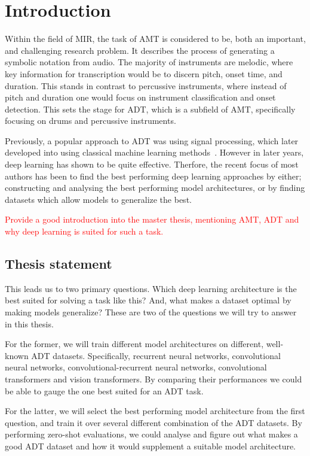 \chapter{Introduction}

Within the field of \gls{MIR}, the task of \gls{AMT} is considered to be, both an important, and challenging research problem. It describes the process of generating a symbolic notation from audio. The majority of instruments are melodic, where key information for transcription would be to discern pitch, onset time, and duration. This stands in contrast to percussive instruments, where instead of pitch and duration one would focus on instrument classification and onset detection. This sets the stage for \gls{ADT}, which is a subfield of \gls{AMT}, specifically focusing on drums and percussive instruments.~\cite{8350302}

Previously, a popular approach to \gls{ADT} was using signal processing, which later developed into using classical machine learning methods~\cite{8350302}. However in later years, deep learning has shown to be quite effective. Therfore, the recent focus of most authors has been to find the best performing deep learning approaches by either; constructing and analysing the best performing model architectures, or by finding datasets which allow models to generalize the best.~\cite{signals4040042}

\textcolor{red}{Provide a good introduction into the master thesis, mentioning \gls{AMT}, \gls{ADT} and why deep learning is suited for such a task.}

\section{Thesis statement}

This leads us to two primary questions. Which deep learning architecture is the best suited for solving a task like this? And, what makes a dataset optimal by making models generalize? These are two of the questions we will try to answer in this thesis. 

For the former, we will train different model architectures on different, well-known \gls{ADT} datasets. Specifically, recurrent neural networks, convolutional neural networks, convolutional-recurrent neural networks, convolutional transformers and vision transformers. By comparing their performances we could be able to gauge the one best suited for an \gls{ADT} task.

For the latter, we will select the best performing model architecture from the first question, and train it over several different combination of the \gls{ADT} datasets. By performing zero-shot evaluations, we could analyse and figure out what makes a good \gls{ADT} dataset and how it would supplement a suitable model architecture.

